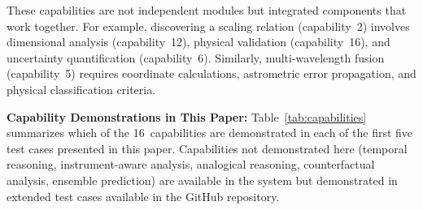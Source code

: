 \documentclass[fleqn,usenatbib]{mnras}
\begin{document}
These capabilities are not independent modules but integrated components that work together.
For example, discovering a scaling relation (capability~2) involves dimensional analysis (capability~12), physical validation (capability~16), and uncertainty quantification (capability~6).
Similarly, multi-wavelength fusion (capability~5) requires coordinate calculations, astrometric error propagation, and physical classification criteria.

\textbf{Capability Demonstrations in This Paper:}
Table~\ref{tab:capabilities} summarizes which of the 16~capabilities are demonstrated in each of the first five test cases presented in this paper.
Capabilities not demonstrated here (temporal reasoning, instrument-aware analysis, analogical reasoning, counterfactual analysis, ensemble prediction) are available in the system but demonstrated in extended test cases available in the GitHub repository.
\end{document}
